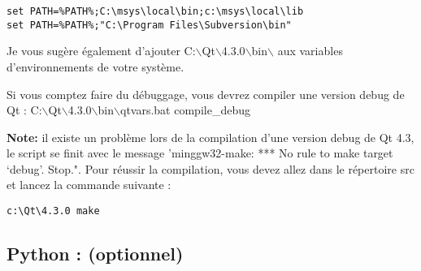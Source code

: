 \begin{verbatim}
set PATH=%PATH%;C:\msys\local\bin;c:\msys\local\lib 
set PATH=%PATH%;"C:\Program Files\Subversion\bin" 
\end{verbatim}

Je vous sug\`ere \'egalement d'ajouter
C:$\backslash$Qt$\backslash$4.3.0$\backslash$bin$\backslash$ aux variables
d'environnements de votre syst\`eme.

Si vous comptez faire du d\'ebuggage, vous devrez compiler une version debug de Qt
:
C:$\backslash$Qt$\backslash$4.3.0$\backslash$bin$\backslash$qtvars.bat
compile\_debug

\textbf{Note:} il existe un probl\`eme lors de la compilation d'une version debug
de Qt 4.3, le script se finit avec le message 'minggw32-make: *** No rule to make target `debug'. Stop.".
Pour r\'eussir la compilation, vous devez allez dans le r\'epertoire src et lancez la commande suivante :

\begin{verbatim}
c:\Qt\4.3.0 make 
\end{verbatim}


 \subsection{Python : (optionnel)}

%
%
%

